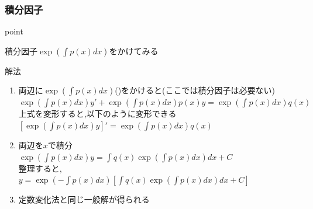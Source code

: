 \documentclass[a4paper]{jsarticle}
\begin{document}
\subsubsection{積分因子}
\begin{itembox}[l]{point}
    \begin{center}
        積分因子$\exp{\left(\int p\left(x\right)dx\right)}$をかけてみる
    \end{center}
\end{itembox}
\begin{itembox}[l]{解法}
    \begin{enumerate}[(1)]
        \item 両辺に$\exp{\left(\int p\left(x\right)dx\right)}$()をかけると(ここでは積分因子は必要ない)\\
              $\exp{\left(\int p\left(x\right)dx\right)}y'+\exp{\left(\int p\left(x\right)dx\right)}p\left(x\right)y=\exp{\left(\int p\left(x\right)dx\right)}q\left(x\right)$\\
              上式を変形すると,以下のように変形できる\\
              $\left[\exp{\left(\int p\left(x\right)dx\right)}y\right]'=\exp{\left(\int p\left(x\right)dx\right)}q\left(x\right)$
        \item 両辺を$x$で積分\\
              $\exp{\left(\int p\left(x\right)dx\right)}y=\int q\left(x\right)\exp{\left(\int p\left(x\right)dx\right)}dx+C$\\
              整理すると,\\
              $y=\exp{\left(-\int p\left(x\right)dx\right)}\left[\int q\left(x\right)\exp{\left(\int p\left(x\right)dx\right)}dx+C\right]$
        \item 定数変化法と同じ一般解が得られる
    \end{enumerate}
\end{itembox}
\end{document}

